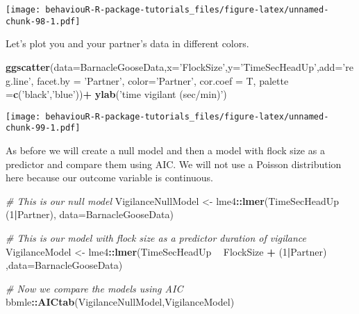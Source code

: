 \documentclass[]{book}
\newenvironment{Shaded}{\begin{snugshade}}{\end{snugshade}}
\newcommand{\CommentTok}[1]{\textcolor[rgb]{0.56,0.35,0.01}{\textit{#1}}}
\newcommand{\DataTypeTok}[1]{\textcolor[rgb]{0.13,0.29,0.53}{#1}}
\newcommand{\DecValTok}[1]{\textcolor[rgb]{0.00,0.00,0.81}{#1}}
\newcommand{\KeywordTok}[1]{\textcolor[rgb]{0.13,0.29,0.53}{\textbf{#1}}}
\newcommand{\NormalTok}[1]{#1}
\newcommand{\OperatorTok}[1]{\textcolor[rgb]{0.81,0.36,0.00}{\textbf{#1}}}
\newcommand{\StringTok}[1]{\textcolor[rgb]{0.31,0.60,0.02}{#1}}
\begin{document}
\texttt{[image: behaviouR-R-package-tutorials\_files/figure-latex/unnamed-chunk-98-1.pdf]}

Let's plot you and your partner's data in different colors.

\begin{Shaded}
\begin{Highlighting}[]
\KeywordTok{ggscatter}\NormalTok{(}\DataTypeTok{data=}\NormalTok{BarnacleGooseData,}\DataTypeTok{x=}\StringTok{'FlockSize'}\NormalTok{,}\DataTypeTok{y=}\StringTok{'TimeSecHeadUp'}\NormalTok{,}\DataTypeTok{add=}\StringTok{'reg.line'}\NormalTok{,}
          \DataTypeTok{facet.by =} \StringTok{'Partner'}\NormalTok{, }\DataTypeTok{color=}\StringTok{'Partner'}\NormalTok{, }\DataTypeTok{cor.coef =}\NormalTok{ T,}
          \DataTypeTok{palette =}\KeywordTok{c}\NormalTok{(}\StringTok{'black'}\NormalTok{,}\StringTok{'blue'}\NormalTok{))}\OperatorTok{+}
\StringTok{            }\KeywordTok{ylab}\NormalTok{(}\StringTok{'time vigilant (sec/min)'}\NormalTok{)}
\end{Highlighting}
\end{Shaded}

\texttt{[image: behaviouR-R-package-tutorials\_files/figure-latex/unnamed-chunk-99-1.pdf]}

As before we will create a null model and then a model with flock size as a predictor and compare them using AIC. We will not use a Poisson distribution here because our outcome variable is continuous.

\begin{Shaded}
\begin{Highlighting}[]
\CommentTok{# This is our null model}
\NormalTok{VigilanceNullModel <-}\StringTok{ }\NormalTok{lme4}\OperatorTok{::}\KeywordTok{lmer}\NormalTok{(TimeSecHeadUp }\OperatorTok{~}\StringTok{ }\NormalTok{(}\DecValTok{1}\OperatorTok{|}\NormalTok{Partner), }\DataTypeTok{data=}\NormalTok{BarnacleGooseData)}

\CommentTok{# This is our model with flock size as a predictor duration of vigilance}
\NormalTok{VigilanceModel <-}\StringTok{ }\NormalTok{lme4}\OperatorTok{::}\KeywordTok{lmer}\NormalTok{(TimeSecHeadUp }\OperatorTok{~}\StringTok{ }\NormalTok{FlockSize }\OperatorTok{+}\StringTok{ }\NormalTok{(}\DecValTok{1}\OperatorTok{|}\NormalTok{Partner) ,}\DataTypeTok{data=}\NormalTok{BarnacleGooseData)}

\CommentTok{# Now we compare the models using AIC}
\NormalTok{bbmle}\OperatorTok{::}\KeywordTok{AICtab}\NormalTok{(VigilanceNullModel,VigilanceModel)}
\end{Highlighting}
\end{Shaded}
\end{document}
